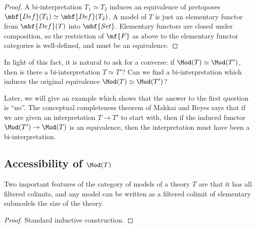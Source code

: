 
\begin{proof}
A bi-interpretation \(T_1 \simeq T_2\) induces an equivalence of pretoposes \(\mbf{Def}(T_1) \simeq \mbf{Def}(T_2)\). A model of \(T\) is just an elementary functor from \(\mbf{Def}(T)\) into \(\mbf{Set}\). Elementary functors are closed under composition, so the restriction of \(\mf{F}\) as above to the elementary functor categories is well-defined, and must be an equivalence.
\end{proof}

In light of this fact, it is natural to ask for a converse: if $\Mod(T) \simeq \Mod(T')$, then is there a bi-interpretation $T \simeq T'$? Can we find a bi-interpretation which induces the original equivalence $\Mod(T) \simeq \Mod(T')$?

Later, we will give an example which shows that the answer to the first question is ``no''. The conceptual completeness theorem of Makkai and Reyes \cite{makkai-reyes} says that if we are given an interpretation $T \to T'$ to start with, then if the induced functor $\Mod(T') \to \Mod(T)$ is an equivalence, then the interpretation must have been a bi-interpretation.

\subsection{Accessibility of $\Mod(T)$}
Two important features of the category of models of a theory $T$ are that it has all filtered colimits, and any model can be written as a filtered colimit of elementary submodels the size of the theory.

\begin{proof}
Standard inductive construction.
  \end{proof}



